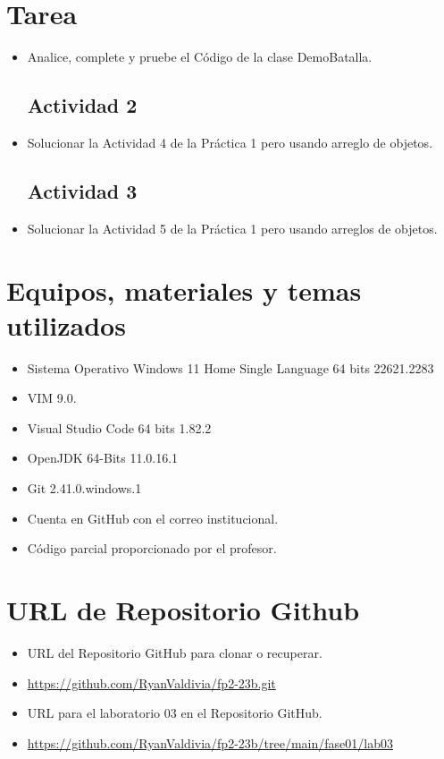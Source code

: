\documentclass{article}
\begin{document}
	\section{Tarea}
	\begin{itemize}
		\subsection{Actividad 1: Demo Batalla}
			\item Analice, complete y pruebe el Código de la clase DemoBatalla.
		\subsection{Actividad 2}
			\item Solucionar la Actividad 4 de la Práctica 1 pero usando arreglo de objetos.
		\subsection{Actividad 3}
			\item Solucionar la Actividad 5 de la Práctica 1 pero usando arreglos de objetos.
	\end{itemize}
		
	\section{Equipos, materiales y temas utilizados}
	\begin{itemize}
		\item Sistema Operativo Windows 11 Home Single Language 64 bits 22621.2283
		\item VIM 9.0.
		\item Visual Studio Code 64 bits 1.82.2
		\item OpenJDK 64-Bits 11.0.16.1
		\item Git 2.41.0.windows.1
		\item Cuenta en GitHub con el correo institucional. 
		\item Código parcial proporcionado por el profesor.
	\end{itemize}
	
	\section{URL de Repositorio Github}
	\begin{itemize}
		\item URL del Repositorio GitHub para clonar o recuperar.
		\item \url{https://github.com/RyanValdivia/fp2-23b.git}
		\item URL para el laboratorio 03 en el Repositorio GitHub.
		\item \url{https://github.com/RyanValdivia/fp2-23b/tree/main/fase01/lab03}
	\end{itemize}
	
\end{document}
